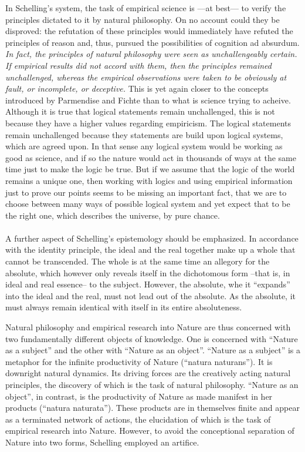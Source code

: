 \documentclass[9pt,a4paper,twocolumn]{article}
\begin{document}
            In Schelling's system, the task of empirical science is —at best— to verify the principles dictated to it by natural philosophy. On no account could they be disproved: the refutation of these principles would immediately have refuted the principles of reason and, thus, pursued the possibilities of cognition ad absurdum. \textit{In fact, the principles of natural philosophy were seen as unchallengeably certain. If empirical results did not accord with them, then the principles remained unchallenged, whereas the empirical observations were taken to be obviously at fault, or incomplete, or deceptive.} This is yet again closer to the concepts introduced by Parmendise and Fichte than to what is science trying to acheive. Although it is true that logical statements remain unchallenged, this is not because they have a higher values regarding empiricism. The logical statements remain unchallenged because they statements are build upon logical systems, which are agreed upon. In that sense any logical system would be working as good as science, and if so the nature would act in thousands of ways at the same time just to make the logic be true. But if we assume that the logic of the world remains a unique one, then working with logics and using empirical information just to prove our points seems to be missing an important fact, that we are to choose between many ways of possible logical system and yet expect that to be the right one, which describes the universe, by pure chance.
            \\
            \\
            A further aspect of Schelling's epistemology should be emphasized. In accordance with the identity principle, the ideal and the real together make up a whole that cannot be transcended. The whole is at the same time an allegory for the absolute, which however only reveals itself in the dichotomous form --that is, in ideal and real essence-- to the subject. However, the absolute, whe it “expands” into the ideal and the real, must not lead out of the absolute. As the absolute, it must always remain identical with itself in its entire absoluteness.
            \begin{qt}
                Natural philosophy and empirical research into Nature are thus concerned with two fundamentally different objects of knowledge. One is concerned with “Nature as a subject” and the other with “Nature as an object”. “Nature as a subject” is a metaphor for the infinite productivity of Nature (“natura naturans”). It is downright natural dynamics. Its driving forces are the creatively acting natural principles, the discovery of which is the task of natural philosophy.  “Nature as an object”, in contrast, is the productivity of Nature as made manifest in her products (“natura naturata”). These products are in themselves finite and appear as a terminated network of actions, the elucidation of which is the task of empirical research into Nature. However, to avoid the conceptional separation of Nature into two forms, Schelling employed an artifice.
            \end{qt}
\end{document}
